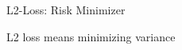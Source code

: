 \documentclass[11pt,compress,t,notes=noshow, xcolor=table]{beamer}
\begin{document}
\begin{vbframe}{L2-Loss: Risk Minimizer}



\end{vbframe}

\begin{vbframe}{L2 loss means minimizing variance}

\vspace{1cm}


\end{vbframe}
\end{document}
